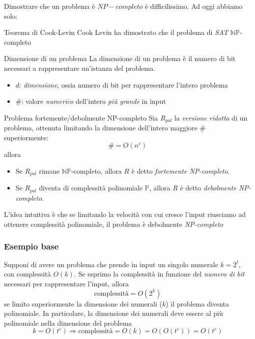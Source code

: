 Dimostrare che un problema è $ NP-completo $ è difficilissimo. Ad oggi abbiamo solo:
\begin{teorema}{Teorema di Cook-Levin}
	Cook Levin ha dimostrato che il problema di \textit{SAT} $ \mathbb{NP} $-completo
\end{teorema}
\begin{definizione}{Dimensione di un problema}
	La dimensione di un problema è il numero di bit necessari a rappresentare un'istanza del problema.
	\begin{itemize}
		\item $ d $: \textit{dimensione}, ossia numero di bit per rappresentare l'intero problema
		\item \#: valore \textit{numerico} dell'intero \textit{più grande} in input
	\end{itemize}
\end{definizione}

\begin{definizione}{Problema fortemente/debolmente NP-completo}
	Sia $ R_{pol} $ la \textit{versione ridotta} di un problema, ottenuta limitando la dimensione dell'intero maggiore \# superiormente:
	\[
		\text{\#} = O\left(n^{c}\right)
	\]
	allora
	\begin{itemize}
		\item   Se $ R_{pol} $ rimane $ \mathbb{NP} $-completo, allora $ R $ è detto \textit{fortemente NP-completo}.
		\item   Se $ R_{pol} $ diventa di complessità polinomiale $ \mathbb{P} $, allora $ R $ è detto \textit{debolmente NP-completo}.
	\end{itemize}
\end{definizione}
L'idea intuitiva è che se limitando la velocità con cui cresce l'input riusciamo ad ottenere complessità polinomiale, il problema è debolmente \textit{NP-completo}
\subsubsection{Esempio base}
Supponi di avere un problema che prende in input un singolo numerale $ k = 2^{t} $, con complessità $ O\left(k\right) $. Se esprimo la complessità in funzione del \textit{numero di bit} necessari per rappresentare l'input, allora
\[
	\text{complessità} = O\left(2^{k}\right)
\]
se limito superiormente la dimensione dei numerali ($ k $) il problema diventa polinomiale. In particolare, la dimensione dei numerali deve essere al più polinomiale nella dimensione del problema
\[
	k = O\left(t^{c}\right) \Rightarrow  \text{complessità} = O\left(k\right) = O\left(O\left(t^{c}\right)\right) = O\left(t^{c}\right)
\]
